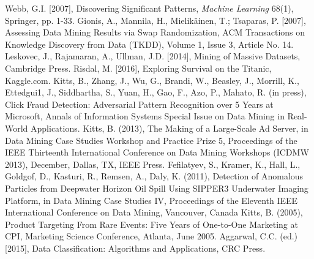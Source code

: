 \begin{thebibliography}{99}
 
 Webb, G.I. [2007], Discovering Significant Patterns, \textit{Machine Learning} 68(1), Springer, pp. 1-33.
 Gionis, A., Mannila, H., Mielik\"ainen, T.; Tsaparas, P. [2007], Assessing Data Mining Results via Swap Randomization, ACM Transactions on Knowledge Discovery from Data (TKDD), Volume 1, Issue 3, Article No. 14.
 Leskovec, J., Rajamaran, A., Ullman, J.D. [2014], Mining of Massive Datasets, Cambridge Press.
 Risdal, M. [2016], Exploring Survival on the Titanic, Kaggle.com.
 Kitts, B., Zhang, J., Wu, G., Brandi, W., Beasley, J., Morrill, K., Ettedgui1, J., Siddhartha, S., Yuan, H., Gao, F., Azo, P., Mahato, R. (in press), Click Fraud Detection: Adversarial Pattern Recognition over 5 Years at Microsoft, Annals of Information Systems Special Issue on Data Mining in Real-World Applications.
 Kitts, B. (2013), The Making of a Large-Scale Ad Server, in Data Mining Case Studies Workshop and Practice Prize 5, Proceedings of the IEEE Thirteenth International Conference on Data Mining Workshops (ICDMW 2013), December, Dallas, TX, IEEE Press.
 Fefilatyev, S., Kramer, K., Hall, L., Goldgof, D., Kasturi, R., Remsen, A., Daly, K. (2011), Detection of Anomalous Particles from Deepwater Horizon Oil Spill Using SIPPER3 Underwater Imaging Platform, in Data Mining Case Studies IV, Proceedings of the Eleventh IEEE International Conference on Data Mining, Vancouver, Canada
 Kitts, B. (2005), Product Targeting From Rare Events: Five Years of One-to-One Marketing at CPI, Marketing Science Conference, Atlanta, June 2005.
 
    
 
 
  
 Aggarwal, C.C. (ed.) [2015], Data Classification: Algorithms and Applications, CRC Press.

\end{thebibliography}
